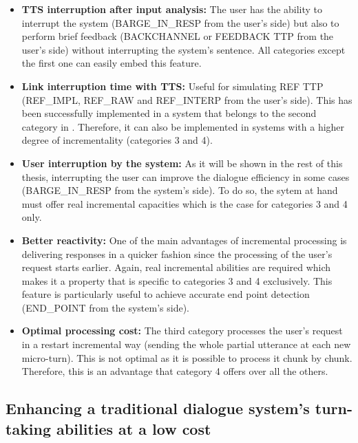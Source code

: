                 \begin{itemize}
                  \item \textbf{TTS interruption after input analysis:} The user has the ability to interrupt the system (BARGE\_IN\_RESP from the user's side) but also to perform brief feedback (BACKCHANNEL or FEEDBACK TTP from the user's side) without interrupting the system's sentence. All categories except the first one can easily embed this feature.
                  \item \textbf{Link interruption time with TTS:} Useful for simulating REF TTP (REF\_IMPL, REF\_RAW and REF\_INTERP from the user's side). This has been successfully implemented in a system that belongs to the second category in \cite{El-Asri2014a}. Therefore, it can also be implemented in systems with a higher degree of incrementality (categories 3 and 4).
                  \item \textbf{User interruption by the system:} As it will be shown in the rest of this thesis, interrupting the user can improve the dialogue efficiency in some cases (BARGE\_IN\_RESP from the system's side). To do so, the sytem at hand must offer real incremental capacities which is the case for categories 3 and 4 only.
                  \item \textbf{Better reactivity:} One of the main advantages of incremental processing is delivering responses in a quicker fashion since the processing of the user's request starts earlier. Again, real incremental abilities are required which makes it a property that is specific to categories 3 and 4 exclusively. This feature is particularly useful to achieve accurate end point detection (END\_POINT from the system's side).
                  \item \textbf{Optimal processing cost:} The third category processes the user's request in a restart incremental way (sending the whole partial utterance at each new micro-turn). This is not optimal as it is possible to process it chunk by chunk. Therefore, this is an advantage that category 4 offers over all the others.
                \end{itemize}

	\subsection{Enhancing a traditional dialogue system's turn-taking abilities at a low cost}
    
